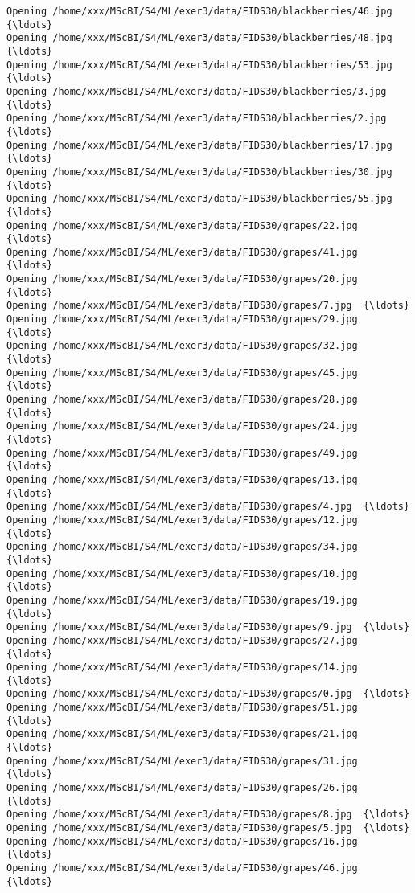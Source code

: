 \documentclass[11pt]{article}
\begin{document}
\begin{Verbatim}[commandchars=\\\{\}]
Opening /home/xxx/MScBI/S4/ML/exer3/data/FIDS30/blackberries/46.jpg  {\ldots}
Opening /home/xxx/MScBI/S4/ML/exer3/data/FIDS30/blackberries/48.jpg  {\ldots}
Opening /home/xxx/MScBI/S4/ML/exer3/data/FIDS30/blackberries/53.jpg  {\ldots}
Opening /home/xxx/MScBI/S4/ML/exer3/data/FIDS30/blackberries/3.jpg  {\ldots}
Opening /home/xxx/MScBI/S4/ML/exer3/data/FIDS30/blackberries/2.jpg  {\ldots}
Opening /home/xxx/MScBI/S4/ML/exer3/data/FIDS30/blackberries/17.jpg  {\ldots}
Opening /home/xxx/MScBI/S4/ML/exer3/data/FIDS30/blackberries/30.jpg  {\ldots}
Opening /home/xxx/MScBI/S4/ML/exer3/data/FIDS30/blackberries/55.jpg  {\ldots}
Opening /home/xxx/MScBI/S4/ML/exer3/data/FIDS30/grapes/22.jpg  {\ldots}
Opening /home/xxx/MScBI/S4/ML/exer3/data/FIDS30/grapes/41.jpg  {\ldots}
Opening /home/xxx/MScBI/S4/ML/exer3/data/FIDS30/grapes/20.jpg  {\ldots}
Opening /home/xxx/MScBI/S4/ML/exer3/data/FIDS30/grapes/7.jpg  {\ldots}
Opening /home/xxx/MScBI/S4/ML/exer3/data/FIDS30/grapes/29.jpg  {\ldots}
Opening /home/xxx/MScBI/S4/ML/exer3/data/FIDS30/grapes/32.jpg  {\ldots}
Opening /home/xxx/MScBI/S4/ML/exer3/data/FIDS30/grapes/45.jpg  {\ldots}
Opening /home/xxx/MScBI/S4/ML/exer3/data/FIDS30/grapes/28.jpg  {\ldots}
Opening /home/xxx/MScBI/S4/ML/exer3/data/FIDS30/grapes/24.jpg  {\ldots}
Opening /home/xxx/MScBI/S4/ML/exer3/data/FIDS30/grapes/49.jpg  {\ldots}
Opening /home/xxx/MScBI/S4/ML/exer3/data/FIDS30/grapes/13.jpg  {\ldots}
Opening /home/xxx/MScBI/S4/ML/exer3/data/FIDS30/grapes/4.jpg  {\ldots}
Opening /home/xxx/MScBI/S4/ML/exer3/data/FIDS30/grapes/12.jpg  {\ldots}
Opening /home/xxx/MScBI/S4/ML/exer3/data/FIDS30/grapes/34.jpg  {\ldots}
Opening /home/xxx/MScBI/S4/ML/exer3/data/FIDS30/grapes/10.jpg  {\ldots}
Opening /home/xxx/MScBI/S4/ML/exer3/data/FIDS30/grapes/19.jpg  {\ldots}
Opening /home/xxx/MScBI/S4/ML/exer3/data/FIDS30/grapes/9.jpg  {\ldots}
Opening /home/xxx/MScBI/S4/ML/exer3/data/FIDS30/grapes/27.jpg  {\ldots}
Opening /home/xxx/MScBI/S4/ML/exer3/data/FIDS30/grapes/14.jpg  {\ldots}
Opening /home/xxx/MScBI/S4/ML/exer3/data/FIDS30/grapes/0.jpg  {\ldots}
Opening /home/xxx/MScBI/S4/ML/exer3/data/FIDS30/grapes/51.jpg  {\ldots}
Opening /home/xxx/MScBI/S4/ML/exer3/data/FIDS30/grapes/21.jpg  {\ldots}
Opening /home/xxx/MScBI/S4/ML/exer3/data/FIDS30/grapes/31.jpg  {\ldots}
Opening /home/xxx/MScBI/S4/ML/exer3/data/FIDS30/grapes/26.jpg  {\ldots}
Opening /home/xxx/MScBI/S4/ML/exer3/data/FIDS30/grapes/8.jpg  {\ldots}
Opening /home/xxx/MScBI/S4/ML/exer3/data/FIDS30/grapes/5.jpg  {\ldots}
Opening /home/xxx/MScBI/S4/ML/exer3/data/FIDS30/grapes/16.jpg  {\ldots}
Opening /home/xxx/MScBI/S4/ML/exer3/data/FIDS30/grapes/46.jpg  {\ldots}

\end{Verbatim}
\end{document}
